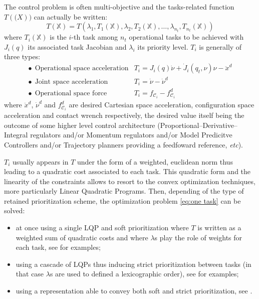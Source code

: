 \documentclass[12pt,a4paper,twoside]{article}
\begin{document}
The control problem is often multi-objective and the tasks-related function $T(\mathbb(X))$ can actually be written:
\begin{equation}\label{eq:multi task}
T(\mathbb{X}) = T\left(\lambda_1, T_1(\mathbb{X}), \lambda_2, T_2(\mathbb{X}), \dots, \lambda_{n_t},T_{n_t}(\mathbb{X})\right)
\end{equation}
where $T_i(\mathbb{X})$ is the $i$-th task among $n_t$ operational tasks to be achieved with $J_i(q)$ its associated task Jacobian and $\lambda_i$ its priority level. $T_i$ is generally of three types:
\begin{equation}
\begin{array}{ll}
\bullet~~\text{Operational space acceleration} & T_i={J_i}({q}){\dot{\nu}} + {\dot{J}_i}({q}_t,{\nu}){\nu} -{\ddot{x}}^{d} \\
\bullet~~\text{Joint space acceleration}       & T_i={\dot{\nu}}-{\dot{\nu}}^{d} \\
\bullet~~\text{Operational space force}        & T_i={f}_{\mathcal{C}_i}-{f}_{\mathcal{C}_i}^{d}
\end{array}
\end{equation}
where ${\ddot{x}}^{d}$, ${\dot{\nu}}^{d}$ and ${f}_{\mathcal{C}_i}^{d}$ are desired Cartesian space acceleration, configuration space acceleration and contact wrench respectively, the desired value itself being the outcome of some higher level control architecture (Proportional--Derivative--Integral regulators and/or Momentum regulators and/or Model Predicitve Controllers and/or Trajectory planners providing a feedfoward reference, \textit{etc}).

$T_i$ usually appears in $T$ under the form of a weighted, euclidean norm thus leading to a quadratic cost associated to each task. This quadratic form and the linearity of the constraints allows to resort to the convex optimization techniques, more particularly Linear Quadratic Programs. Then, depending of the type of retained prioritization scheme, the optimization problem \ref{eq:one task} can be solved:
\begin{itemize}
\item at once using a single LQP and soft prioritization where $T$ is written as a weighted sum of quadratic costs and where $\lambda$s play the role of weights for each task, see \cite{Salini2011,bouyarmane2011using} for examples;
\item using a cascade of LQPs thus inducing strict prioritization between tasks (in that case $\lambda$s are used to defined a lexicographic order), see \cite{Saab13,herzog2014balancing,hierarchicalq} for examples;
\item using a representation able to convey both soft and strict prioritization, see \cite{liu-AutRob2015,liu-AutRobSI2015}.
\end{itemize}
\end{document}
